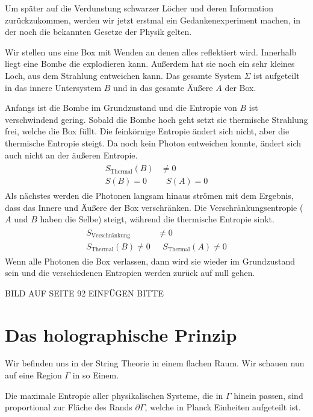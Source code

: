 \documentclass[ngerman]{scrartcl}
\begin{document}
Um später auf die Verdunstung schwarzer Löcher und deren Information zurückzukommen, werden wir jetzt erstmal ein Gedankenexperiment machen, in der noch die bekannten Gesetze der Physik gelten.

Wir stellen uns eine Box mit Wenden an denen alles reflektiert wird. Innerhalb liegt eine Bombe die explodieren kann. Außerdem hat sie noch ein sehr kleines Loch, aus dem Strahlung entweichen kann.
Das gesamte System $\Sigma$ ist aufgeteilt in das innere Untersystem $B$ und in das gesamte Äußere $A$ der Box. 

Anfangs ist die Bombe im Grundzustand und die Entropie von $B$ ist verschwindend gering.
Sobald die Bombe hoch geht setzt sie thermische Strahlung frei, welche die Box füllt. Die feinkörnige Entropie ändert sich nicht, aber die thermische Entropie steigt. Da noch kein Photon entweichen konnte, ändert sich auch nicht an der äußeren Entropie.
	\begin{align}
		\begin{aligned}
			S_{\text{Thermal}} (B) &\neq 0 \\
			S(B) = 0 &~~~ S(A) = 0
		\end{aligned}
	\end{align}
Als nächstes werden die Photonen langsam hinaus strömen mit dem Ergebnis, dass das Innere und Äußere der Box verschränken. Die Verschränkungsentropie ($A$ und $B$ haben die Selbe) steigt, während die thermische Entropie sinkt. 
	\begin{align}
	\begin{aligned}
	S_{\text{Verschränkung}} &\neq 0 \\
	S_{\text{Thermal}} (B) \neq 0 &~~~ S_{\text{Thermal}}(A) \neq 0
	\end{aligned}
	\end{align}
Wenn alle Photonen die Box verlassen, dann wird sie wieder im Grundzustand sein und die verschiedenen Entropien werden zurück auf null gehen.
	
	BILD AUF SEITE 92 EINFÜGEN BITTE

\section{Das holographische Prinzip}
Wir befinden uns in der String Theorie in einem flachen Raum. Wir schauen nun auf eine Region $\Gamma$ in so Einem. 

Die maximale Entropie aller physikalischen Systeme, die in $\Gamma$ hinein passen, sind proportional zur Fläche des Rands $\partial \Gamma$, welche in Planck Einheiten aufgeteilt ist. 
\end{document}
